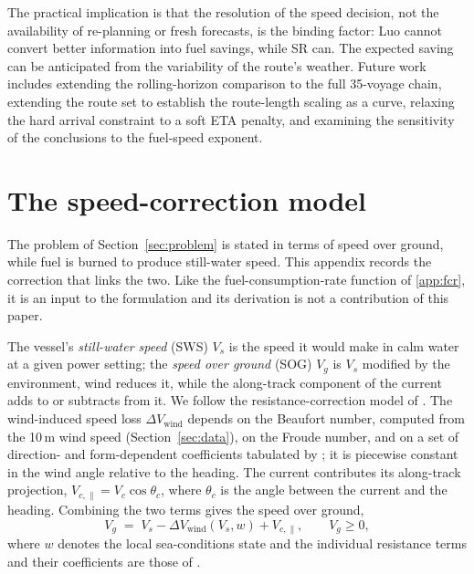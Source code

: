 \documentclass[review,authoryear]{elsarticle}
\begin{document}
The practical implication is that the resolution of the speed decision, not the availability of
re-planning or fresh forecasts, is the binding factor: Luo cannot convert better
information into fuel savings, while SR can. The expected saving can be anticipated
from the variability of the route's weather. Future work includes extending the rolling-horizon
comparison to the full 35-voyage chain, extending the route set to establish the route-length scaling
as a curve, relaxing the hard arrival constraint to a soft ETA penalty, and examining the sensitivity
of the conclusions to the fuel-speed exponent.

\appendix

\section{The speed-correction model}
\label{app:sog}

The problem of Section~\ref{sec:problem} is stated in terms of speed over ground, while fuel is burned
to produce still-water speed. This appendix records the correction that links the two. Like the
fuel-consumption-rate function of \ref{app:fcr}, it is an input to the formulation and its
derivation is not a contribution of this paper.

The vessel's \emph{still-water speed} (SWS) $V_s$ is the speed it would make in calm water at a given
power setting; the \emph{speed over ground} (SOG) $V_g$ is $V_s$ modified by the environment, wind
reduces it, while the along-track component of the current adds to or subtracts from it. We follow the
resistance-correction model of \citet{yang2020}. The wind-induced speed loss
$\Delta V_{\text{wind}}$ depends on the Beaufort number, computed from the 10\,m wind speed
(Section~\ref{sec:data}), on the Froude number, and on a set of direction- and form-dependent
coefficients tabulated by \citet{yang2020}; it is piecewise constant in the wind angle relative to the
heading. The current contributes its along-track projection, $V_{c,\parallel}=V_c\cos\theta_c$, where
$\theta_c$ is the angle between the current and the heading. Combining the two terms gives the speed
over ground,
\begin{equation}
\label{eq:sog}
V_g \;=\; V_s - \Delta V_{\text{wind}}(V_s,w) + V_{c,\parallel},
\qquad V_g \ge 0,
\end{equation}
where $w$ denotes the local sea-conditions state and the individual resistance terms and their
coefficients are those of \citet{yang2020}.
\end{document}
